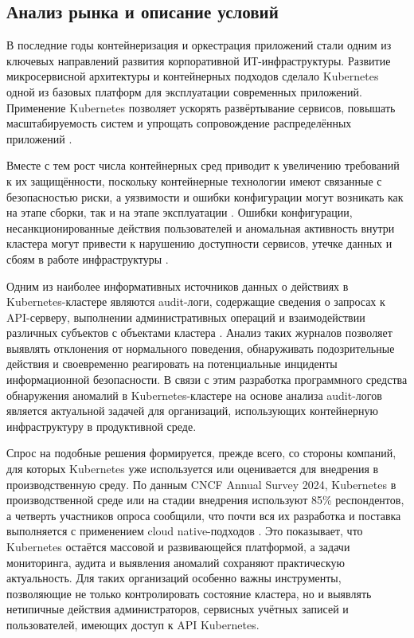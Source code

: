 \subsection{Анализ рынка и описание условий}

В последние годы контейнеризация и оркестрация приложений стали одним из ключевых направлений развития корпоративной ИТ-инфраструктуры. Развитие микросервисной архитектуры и контейнерных подходов сделало Kubernetes одной из базовых платформ для эксплуатации современных приложений. Применение Kubernetes позволяет ускорять развёртывание сервисов, повышать масштабируемость систем и упрощать сопровождение распределённых приложений \cite{Kubernetes}.

Вместе с тем рост числа контейнерных сред приводит к увеличению требований к их защищённости, поскольку контейнерные технологии имеют связанные с безопасностью риски, а уязвимости и ошибки конфигурации могут возникать как на этапе сборки, так и на этапе эксплуатации \cite{NISTSP800190}. Ошибки конфигурации, несанкционированные действия пользователей и аномальная активность внутри кластера могут привести к нарушению доступности сервисов, утечке данных и сбоям в работе инфраструктуры \cite{NISTSP800190}.

Одним из наиболее информативных источников данных о действиях в Kubernetes-кластере являются audit-логи, содержащие сведения о запросах к API-серверу, выполнении административных операций и взаимодействии различных субъектов с объектами кластера \cite{KubernetesAudit}. Анализ таких журналов позволяет выявлять отклонения от нормального поведения, обнаруживать подозрительные действия и своевременно реагировать на потенциальные инциденты информационной безопасности. В связи с этим разработка программного средства обнаружения аномалий в Kubernetes-кластере на основе анализа audit-логов является актуальной задачей для организаций, использующих контейнерную инфраструктуру в продуктивной среде.

Спрос на подобные решения формируется, прежде всего, со стороны компаний, для которых Kubernetes уже используется или оценивается для внедрения в производственную среду. По данным CNCF Annual Survey 2024, Kubernetes в производственной среде или на стадии внедрения используют 85\% респондентов, а четверть участников опроса сообщили, что почти вся их разработка и поставка выполняется с применением cloud native-подходов \cite{CNCFAnnualSurvey2024}. Это показывает, что Kubernetes остаётся массовой и развивающейся платформой, а задачи мониторинга, аудита и выявления аномалий сохраняют практическую актуальность. Для таких организаций особенно важны инструменты, позволяющие не только контролировать состояние кластера, но и выявлять нетипичные действия администраторов, сервисных учётных записей и пользователей, имеющих доступ к API Kubernetes.

